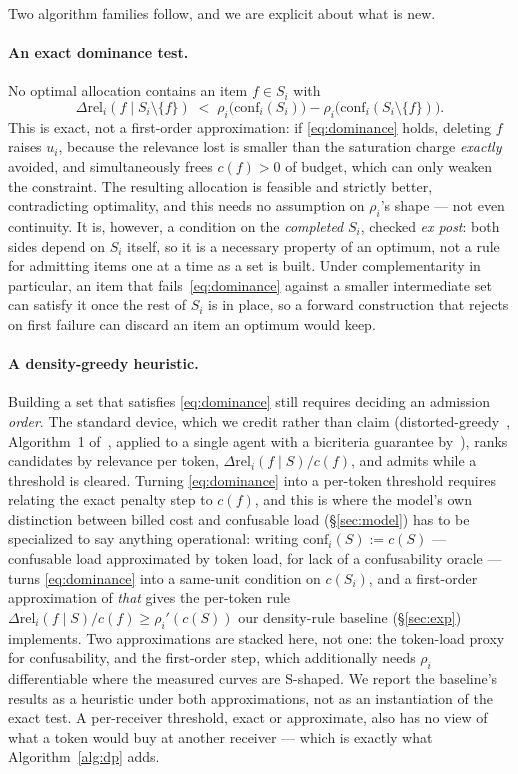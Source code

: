 \documentclass[sigconf,anonymous]{aamas}
\theoremstyle{remark}
\begin{document}
Two algorithm families follow, and we are explicit about what is new.

\paragraph{An exact dominance test.} No optimal allocation contains an
item $f \in S_i$ with
\begin{equation}
\Delta\mathrm{rel}_i(f \mid S_i\setminus\{f\}) \;<\;
\rho_i\bigl(\mathrm{conf}_i(S_i)\bigr) - \rho_i\bigl(\mathrm{conf}_i(S_i\setminus\{f\})\bigr).
\label{eq:dominance}
\end{equation}
This is exact, not a first-order approximation: if \eqref{eq:dominance}
holds, deleting $f$ raises $u_i$, because the relevance lost is smaller
than the saturation charge \emph{exactly} avoided, and simultaneously
frees $c(f)>0$ of budget, which can only weaken the constraint. The
resulting allocation is feasible and strictly better, contradicting
optimality, and this needs no assumption on $\rho_i$'s shape --- not
even continuity. It is, however, a condition on the \emph{completed}
$S_i$, checked \emph{ex post}: both sides depend on $S_i$ itself, so it
is a necessary property of an optimum, not a rule for admitting items
one at a time as a set is built. Under complementarity in particular,
an item that fails~\eqref{eq:dominance} against a smaller intermediate
set can satisfy it once the rest of $S_i$ is in place, so a forward
construction that rejects on first failure can discard an item an
optimum would keep.

\paragraph{A density-greedy heuristic.} Building a set that satisfies
\eqref{eq:dominance} still requires deciding an admission \emph{order}.
The standard device, which we credit rather than claim
(distorted-greedy~\cite{harshaw2019}, Algorithm~1
of~\cite{shilai2024}, applied to a single agent with a bicriteria
guarantee by~\cite{bps2026}), ranks candidates by relevance per token,
$\Delta\mathrm{rel}_i(f\mid S)/c(f)$, and admits while a threshold is
cleared. Turning \eqref{eq:dominance} into a per-token threshold
requires relating the exact penalty step to $c(f)$, and this is where
the model's own distinction between billed cost and confusable load
(\S\ref{sec:model}) has to be specialized to say anything operational:
writing $\mathrm{conf}_i(S) := c(S)$ --- confusable load approximated
by token load, for lack of a confusability oracle --- turns
\eqref{eq:dominance} into a same-unit condition on $c(S_i)$, and a
first-order approximation of \emph{that} gives the per-token rule
$\Delta\mathrm{rel}_i(f\mid S)/c(f) \ge \rho_i'(c(S))$ our density-rule
baseline (\S\ref{sec:exp}) implements. Two approximations are stacked
here, not one: the token-load proxy for confusability, and the
first-order step, which additionally needs $\rho_i$ differentiable
where the measured curves are S-shaped. We report the baseline's
results as a heuristic under both approximations, not as an
instantiation of the exact test. A per-receiver threshold, exact or
approximate, also has no view of what a token would buy at another
receiver --- which is exactly what
Algorithm~\ref{alg:dp} adds.
\end{document}
